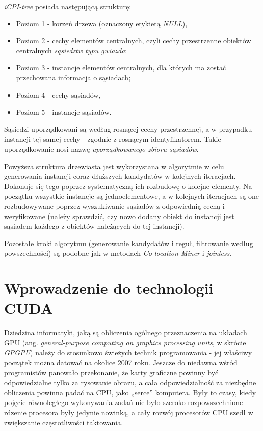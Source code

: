 \documentclass[12pt]{article}
\begin{document}
\textit{iCPI-tree} posiada następującą strukturę:

\begin{itemize}
\item Poziom 1 - korzeń drzewa (oznaczony etykietą \textit{NULL}),
\item Poziom 2 - cechy elementów centralnych, czyli cechy przestrzenne obiektów centralnych \textit{sąsiedztw typu gwiazda};
\item Poziom 3 - instancje elementów centralnych, dla których ma zostać przechowana informacja o sąsiadach;
\item Poziom 4 - cechy sąsiadów,
\item Poziom 5 - instancje sąsiadów.
\end{itemize}

Sąsiedzi uporządkowani są według rosnącej cechy przestrzennej, a w przypadku instancji tej samej cechy - zgodnie z rosnącym identyfikatorem. Takie uporządkowanie nosi nazwę \textit{uporządkowanego zbioru sąsiadów}.

Powyższa struktura drzewiasta jest wykorzystana w algorytmie w celu generowania instancji coraz dłuższych kandydatów w kolejnych iteracjach. Dokonuje się tego poprzez systematyczną ich rozbudowę o kolejne elementy. Na początku wszystkie instancje są jednoelementowe, a w kolejnych iteracjach są one rozbudowywane poprzez wyszukiwanie sąsiadów z odpowiednią cechą i weryfikowane (należy sprawdzić, czy nowo dodany obiekt do instancji jest sąsiadem każdego z obiektów należących do tej instancji). 

Pozostałe kroki algorytmu (generowanie kandydatów i reguł, filtrowanie według powszechności) są podobne jak w metodach \textit{Co-location Miner} i \textit{joinless}.

\newpage

\section{Wprowadzenie do technologii CUDA}
\label{sec:cuda}

Dziedzina informatyki, jaką są obliczenia ogólnego przeznaczenia na układach GPU (ang. \textit{general-purpose computing on graphics processing units}, w skrócie \textit{GPGPU}) należy do stosunkowo świeżych technik programowania - jej właściwy początek można datować na okolice 2007 roku. Jeszcze do niedawna wśród programistów panowało przekonanie, że karty graficzne powinny być odpowiedzialne tylko za rysowanie obrazu, a cała odpowiedzialność za niezbędne obliczenia powinna padać na CPU, jako „serce” komputera. Były to czasy, kiedy pojęcie równoległego wykonywania zadań nie było szeroko rozpowszechnione - rdzenie procesora były jedynie nowinką, a cały rozwój procesorów CPU szedł w zwiększanie częstotliwości taktowania.
\end{document}
